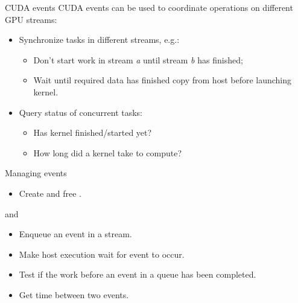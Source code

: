\documentclass[aspectratio=43]{beamer}
\begin{document}
\begin{frame}[fragile]{CUDA events}
    CUDA events can be used to coordinate operations on different GPU streams:
    \begin{itemize}
        \item Synchronize tasks in different streams, e.g.:
        \begin{itemize}
            \item Don't start work in stream \textit{a} until stream \textit{b} has finished;
            \item Wait until required data has finished copy from host before launching kernel.
        \end{itemize}
        \item Query status of concurrent tasks:
        \begin{itemize}
            \item Has kernel finished/started yet?
            \item How long did a kernel take to compute?
        \end{itemize}
    \end{itemize}
\end{frame}

\begin{frame}[fragile]{Managing events}
        \begin{itemize}
            \item Create and free .
        \end{itemize}
    \centering{} and 
        \begin{itemize}
            \item Enqueue an event in a stream.
        \end{itemize}
    \centering{}
        \begin{itemize}
            \item Make host execution wait for event to occur.
        \end{itemize}
    \centering{}
        \begin{itemize}
            \item Test if the work before an event in a queue has been completed.
        \end{itemize}
    \centering{}
        \begin{itemize}
            \item Get time between two events.
        \end{itemize}
    \centering{}

\end{frame}
\end{document}
